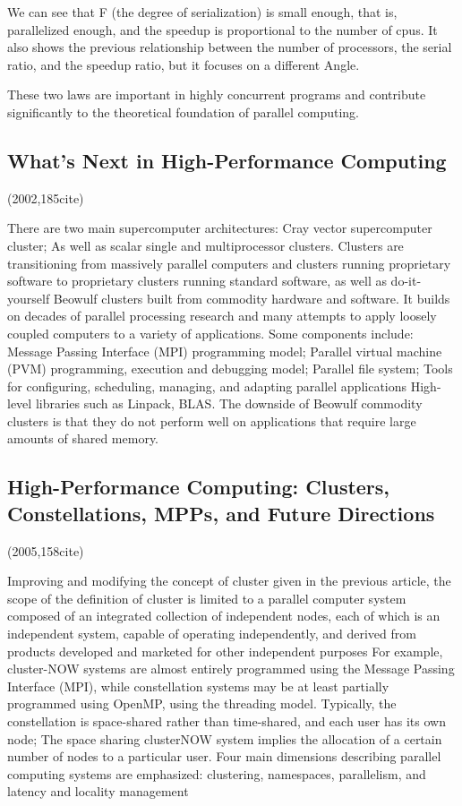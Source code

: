 \documentclass[a4paper,twoside]{scrbook}
\begin{document}
We can see that F (the degree of serialization) is small enough, that is, parallelized enough, and the speedup is proportional to the number of cpus. It also shows the previous relationship between the number of processors, the serial ratio, and the speedup ratio, but it focuses on a different Angle.

These two laws are important in highly concurrent programs and contribute significantly to the theoretical foundation of parallel computing.
\subsection{What’s Next in High-Performance Computing\cite{bell2002s}}
(2002,185cite)\par
There are two main supercomputer architectures: Cray vector supercomputer cluster; As well as scalar single and multiprocessor clusters. Clusters are transitioning from massively parallel computers and clusters running proprietary software to proprietary clusters running standard software, as well as do-it-yourself Beowulf clusters built from commodity hardware and software.
It builds on decades of parallel processing research and many attempts to apply loosely coupled computers to a variety of applications. Some components include: Message Passing Interface (MPI) programming model; Parallel virtual machine (PVM) programming, execution and debugging model; Parallel file system; Tools for configuring, scheduling, managing, and adapting parallel applications High-level libraries such as Linpack, BLAS.
The downside of Beowulf commodity clusters is that they do not perform well on applications that require large amounts of shared memory.
\subsection{High-Performance Computing: Clusters, Constellations, MPPs, and Future Directions\cite{dongarra2005high}}
(2005,158cite)\par
Improving and modifying the concept of cluster given in the previous article, the scope of the definition of cluster is limited to a parallel computer system composed of an integrated collection of independent nodes, each of which is an independent system, capable of operating independently, and derived from products developed and marketed for other independent purposes
For example, cluster-NOW systems are almost entirely programmed using the Message Passing Interface (MPI), while constellation systems may be at least partially programmed using OpenMP, using the threading model. Typically, the constellation is space-shared rather than time-shared, and each user has its own node; The space sharing clusterNOW system implies the allocation of a certain number of nodes to a particular user.
Four main dimensions describing parallel computing systems are emphasized: clustering, namespaces, parallelism, and latency and locality management
\end{document}

